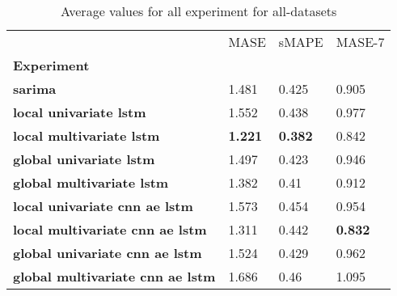 \begin{table}[h]
\centering
\caption{Average values for all experiment for all-datasets}
\label{table:Average-metric-all-datasets}
\begin{tabular}{llll}
\toprule
{} &            MASE &           sMAPE &          MASE-7 \\
\textbf{Experiment                     } &                 &                 &                 \\
\midrule
\textbf{sarima                         } &           1.481 &           0.425 &           0.905 \\
\textbf{local univariate lstm          } &           1.552 &           0.438 &           0.977 \\
\textbf{local multivariate lstm        } &  \textbf{1.221} &  \textbf{0.382} &           0.842 \\
\textbf{global univariate lstm         } &           1.497 &           0.423 &           0.946 \\
\textbf{global multivariate lstm       } &           1.382 &            0.41 &           0.912 \\
\textbf{local univariate cnn ae lstm   } &           1.573 &           0.454 &           0.954 \\
\textbf{local multivariate cnn ae lstm } &           1.311 &           0.442 &  \textbf{0.832} \\
\textbf{global univariate cnn ae lstm  } &           1.524 &           0.429 &           0.962 \\
\textbf{global multivariate cnn ae lstm} &           1.686 &            0.46 &           1.095 \\
\bottomrule
\end{tabular}
\end{table}
